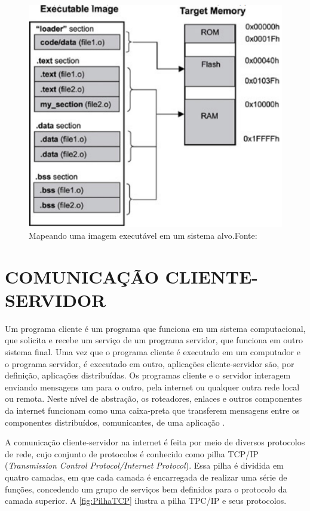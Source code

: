 \begin{figure}[H]
    \scriptsize
     \centering
     \includegraphics[scale=0.7]{dados/figuras/Linker4.png}
     \caption{Mapeando uma imagem executável em um sistema alvo.\newline Fonte:\cite{Qing2003}}
     \label{linker}
\end{figure}







\section {COMUNICAÇÃO CLIENTE-SERVIDOR}

Um programa cliente é um programa que funciona em um sistema computacional, que solicita e recebe um serviço de um programa servidor, que funciona em outro sistema final. Uma vez que o programa cliente é executado em um computador e o programa servidor, é executado em outro, aplicações cliente-servidor são, por definição, aplicações distribuídas. Os programas cliente e o servidor interagem enviando mensagens um para o outro, pela internet ou qualquer outra rede local ou remota. Neste nível de abstração, os roteadores, enlaces e outros componentes da internet funcionam como uma caixa-preta que transferem mensagens entre os componentes distribuídos, comunicantes, de uma aplicação \cite{Kurose2010}.

A comunicação cliente-servidor na internet é feita por meio de diversos protocolos de rede, cujo conjunto de protocolos é conhecido como pilha TCP/IP (\textit{Transmission Control Protocol/Internet Protocol}). Essa pilha é dividida em quatro camadas, em que cada camada é encarregada de realizar uma série de funções, concedendo um grupo de serviços bem definidos para o protocolo da camada superior. A \autoref{fig:PilhaTCP} ilustra a pilha TPC/IP e seus protocolos. 

